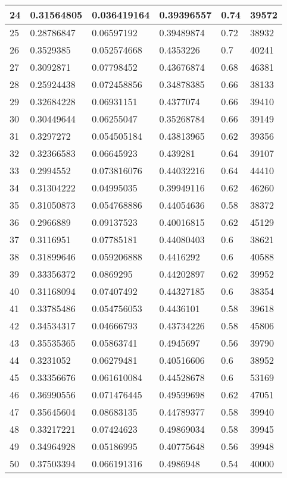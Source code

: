 \begin{longtable}{|l|l|l|l|l|l|}
24 & 0.31564805 & 0.036419164 & 0.39396557 & 0.74 & 39572 \\ \hline 
25 & 0.28786847 & 0.06597192 & 0.39489874 & 0.72 & 38932 \\ \hline 
26 & 0.3529385 & 0.052574668 & 0.4353226 & 0.7 & 40241 \\ \hline 
27 & 0.3092871 & 0.07798452 & 0.43676874 & 0.68 & 46381 \\ \hline 
28 & 0.25924438 & 0.072458856 & 0.34878385 & 0.66 & 38133 \\ \hline 
29 & 0.32684228 & 0.06931151 & 0.4377074 & 0.66 & 39410 \\ \hline 
30 & 0.30449644 & 0.06255047 & 0.35268784 & 0.66 & 39149 \\ \hline 
31 & 0.3297272 & 0.054505184 & 0.43813965 & 0.62 & 39356 \\ \hline 
32 & 0.32366583 & 0.06645923 & 0.439281 & 0.64 & 39107 \\ \hline 
33 & 0.2994552 & 0.073816076 & 0.44032216 & 0.64 & 44410 \\ \hline 
34 & 0.31304222 & 0.04995035 & 0.39949116 & 0.62 & 46260 \\ \hline 
35 & 0.31050873 & 0.054768886 & 0.44054636 & 0.58 & 38372 \\ \hline 
36 & 0.2966889 & 0.09137523 & 0.40016815 & 0.62 & 45129 \\ \hline 
37 & 0.3116951 & 0.07785181 & 0.44080403 & 0.6 & 38621 \\ \hline 
38 & 0.31899646 & 0.059206888 & 0.4416292 & 0.6 & 40588 \\ \hline 
39 & 0.33356372 & 0.0869295 & 0.44202897 & 0.62 & 39952 \\ \hline 
40 & 0.31168094 & 0.07407492 & 0.44327185 & 0.6 & 38354 \\ \hline 
41 & 0.33785486 & 0.054756053 & 0.4436101 & 0.58 & 39618 \\ \hline 
42 & 0.34534317 & 0.04666793 & 0.43734226 & 0.58 & 45806 \\ \hline 
43 & 0.35535365 & 0.05863741 & 0.4945697 & 0.56 & 39790 \\ \hline 
44 & 0.3231052 & 0.06279481 & 0.40516606 & 0.6 & 38952 \\ \hline 
45 & 0.33356676 & 0.061610084 & 0.44528678 & 0.6 & 53169 \\ \hline 
46 & 0.36990556 & 0.071476445 & 0.49599698 & 0.62 & 47051 \\ \hline 
47 & 0.35645604 & 0.08683135 & 0.44789377 & 0.58 & 39940 \\ \hline 
48 & 0.33217221 & 0.07424623 & 0.49869034 & 0.58 & 39945 \\ \hline 
49 & 0.34964928 & 0.05186995 & 0.40775648 & 0.56 & 39948 \\ \hline 
50 & 0.37503394 & 0.066191316 & 0.4986948 & 0.54 & 40000 \\ \hline 
\end{longtable}